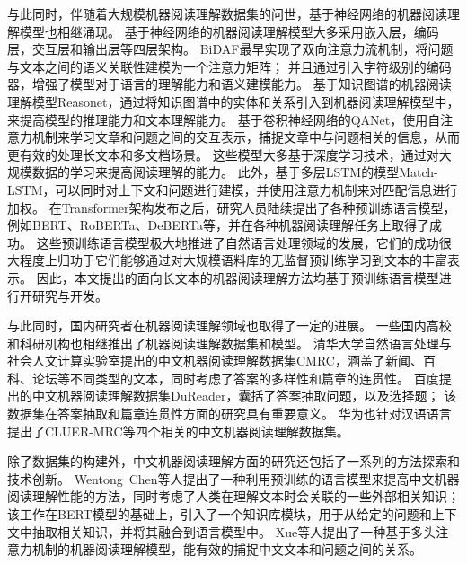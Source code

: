 与此同时，伴随着大规模机器阅读理解数据集的问世，基于神经网络的机器阅读理解模型也相继涌现。
基于神经网络的机器阅读理解模型大多采用嵌入层，编码层，交互层和输出层等四层架构。
BiDAF\cite{Seo2016BidirectionalAF}最早实现了双向注意力流机制，将问题与文本之间的语义关联性建模为一个注意力矩阵；
并且通过引入字符级别的编码器，增强了模型对于语言的理解能力和语义建模能力。
基于知识图谱的机器阅读理解模型Reasonet\cite{Shen2016ReasoNetLT}，通过将知识图谱中的实体和关系引入到机器阅读理解模型中，来提高模型的推理能力和文本理解能力。
基于卷积神经网络的QANet\cite{Yu2018QANetCL}，使用自注意力机制来学习文章和问题之间的交互表示，捕捉文章中与问题相关的信息，从而更有效的处理长文本和多文档场景。
这些模型大多基于深度学习技术，通过对大规模数据的学习来提高阅读理解的能力。
此外，基于多层LSTM的模型Match-LSTM\cite{Wang2016MachineCU}，可以同时对上下文和问题进行建模，并使用注意力机制来对匹配信息进行加权。
在Transformer架构发布之后，研究人员陆续提出了各种预训练语言模型，例如BERT\cite{devlin2018bert}、RoBERTa\cite{liu2019roberta}、DeBERTa\cite{he2021debertav3}等，并在各种机器阅读理解任务上取得了成功。
这些预训练语言模型极大地推进了自然语言处理领域的发展，它们的成功很大程度上归功于它们能够通过对大规模语料库的无监督预训练学习到文本的丰富表示。
因此，本文提出的面向长文本的机器阅读理解方法均基于预训练语言模型进行开研究与开发。

与此同时，国内研究者在机器阅读理解领域也取得了一定的进展。
一些国内高校和科研机构也相继推出了机器阅读理解数据集和模型。
清华大学自然语言处理与社会人文计算实验室提出的中文机器阅读理解数据集CMRC\cite{Cui2019ASD}，涵盖了新闻、百科、论坛等不同类型的文本，同时考虑了答案的多样性和篇章的连贯性。
百度提出的中文机器阅读理解数据集DuReader\cite{He2017DuReaderAC}，囊括了答案抽取问题，以及选择题；
该数据集在答案抽取和篇章连贯性方面的研究具有重要意义。
华为也针对汉语语言提出了CLUER-MRC\cite{xu2020clue}等四个相关的中文机器阅读理解数据集。

除了数据集的构建外，中文机器阅读理解方面的研究还包括了一系列的方法探索和技术创新。
Wentong\ Chen等人\cite{Chen2022ChineseMR}提出了一种利用预训练的语言模型来提高中文机器阅读理解性能的方法，同时考虑了人类在理解文本时会关联的一些外部相关知识；
该工作在BERT模型的基础上，引入了一个知识库模块，用于从给定的问题和上下文中抽取相关知识，并将其融合到语言模型中。
Xue等人\cite{xue2022machine}提出了一种基于多头注意力机制的机器阅读理解模型，能有效的捕捉中文文本和问题之间的关系。


